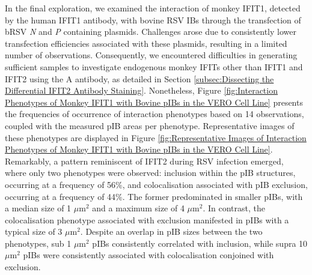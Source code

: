 In the final exploration, we examined the interaction of monkey IFIT1, detected by the human IFIT1 antibody, with bovine RSV IBs through the transfection of bRSV \textit{N} and \textit{P} containing plasmids. Challenges arose due to consistently lower transfection efficiencies associated with these plasmids, resulting in a limited number of observations. Consequently, we encountered difficulties in generating sufficient samples to investigate endogenous monkey IFITs other than IFIT1 and IFIT2 using the A antibody, as detailed in Section \ref{subsec:Dissecting the Differential IFIT2 Antibody Staining}. Nonetheless, Figure \ref{fig:Interaction Phenotypes of Monkey IFIT1 with Bovine pIBs in the VERO Cell Line} presents the frequencies of occurrence of interaction phenotypes based on 14 observations, coupled with the measured pIB areas per phenotype. Representative images of these phenotypes are displayed in Figure \ref{fig:Representative Images of Interaction Phenotypes of Monkey IFIT1 with Bovine pIBs in the VERO Cell Line}. Remarkably, a pattern reminiscent of IFIT2 during RSV infection emerged, where only two phenotypes were observed: inclusion within the pIB structures, occurring at a frequency of 56\%, and colocalisation associated with pIB exclusion, occurring at a frequency of 44\%. The former predominated in smaller pIBs, with a median size of 1 \(\mu \mbox{m}^2\) and a maximum size of 4 \(\mu \mbox{m}^2\). In contrast, the colocalisation phenotype associated with exclusion manifested in pIBs with a typical size of 3 \(\mu \mbox{m}^2\). Despite an overlap in pIB sizes between the two phenotypes, sub 1 \(\mu \mbox{m}^2\) pIBs consistently correlated with inclusion, while supra 10 \(\mu \mbox{m}^2\) pIBs were consistently associated with colocalisation conjoined with exclusion.

